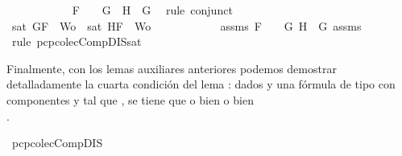 \begin{isabellebody}
\ \ \ \ \ \ \ \ \ \ \isamarkupfalse%
\ {\isacartoucheopen}F\ {\isacharequal}\ \isactrlbold {\isasymnot}\ {\isacharparenleft}\isactrlbold {\isasymnot}\ G{\isacharparenright}\ {\isasymand}\ H\ {\isacharequal}\ G{\isacartoucheclose}\ \isamarkupfalse%
\ {\isacharparenleft}rule\ conjunct{}{\isacharparenright}\isanewline
\ \ \ \ \ \ \ \ \isamarkupfalse%
\ {\isachardoublequoteopen}sat\ {\isacharparenleft}{\isacharbraceleft}G{\isacharcomma}F{\isacharbraceright}\ {\isasymunion}\ Wo{\isacharparenright}\ {\isasymor}\ sat\ {\isacharparenleft}{\isacharbraceleft}H{\isacharcomma}F{\isacharbraceright}\ {\isasymunion}\ Wo{\isacharparenright}{\isachardoublequoteclose}\isanewline
\ \ \ \ \ \ \ \ \ \ \isamarkupfalse%
\ assms{\isacharparenleft}{}{\isacharparenright}\ {\isacartoucheopen}F\ {\isacharequal}\ \isactrlbold {\isasymnot}\ {\isacharparenleft}\isactrlbold {\isasymnot}\ G{\isacharparenright}{\isacartoucheclose}\ {\isacartoucheopen}H\ {\isacharequal}\ G{\isacartoucheclose}\ assms{\isacharparenleft}{}{\isacharcomma}{}{\isacharcomma}{}{\isacharparenright}\ \isamarkupfalse%
\ {\isacharparenleft}rule\ pcp{\isacharunderscore}colecComp{\isacharunderscore}DIS{\isacharunderscore}sat{}{\isacharparenright}\isanewline
\ \ \ \ \ \ \isamarkupfalse%
\isanewline
\ \ \ \ \isamarkupfalse%
\isanewline
\ \ \isamarkupfalse%
\isanewline
{}\isamarkupfalse%
%
\endisatagproof
{\isafoldproof}%
%
\isadelimproof
%
\endisadelimproof
%
\begin{isamarkuptext}%
Finalmente, con los lemas auxiliares anteriores podemos demostrar detalladamente la cuarta 
  condición del lema : dados  y  una fórmula de tipo \isa{{\isasymbeta}} con componentes  y 
   tal que , se tiene que o bien  o bien\\ .%
\end{isamarkuptext}\isamarkuptrue%
\isamarkupfalse%
\ pcp{\isacharunderscore}colecComp{\isacharunderscore}DIS{\isacharcolon}\isanewline

\end{isabellebody}

